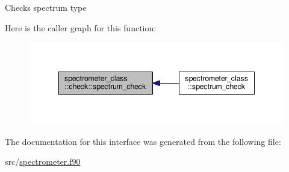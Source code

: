 Checks spectrum type 



Here is the caller graph for this function\+:\nopagebreak
\begin{figure}[H]
\begin{center}
\leavevmode
\includegraphics[width=345pt]{interfacespectrometer__class_1_1check_a1d14d7c8751b28855644e3d7ab669260_icgraph}
\end{center}
\end{figure}




The documentation for this interface was generated from the following file\+:\begin{DoxyCompactItemize}
\item 
src/\hyperlink{spectrometer_8f90}{spectrometer.\+f90}\end{DoxyCompactItemize}
